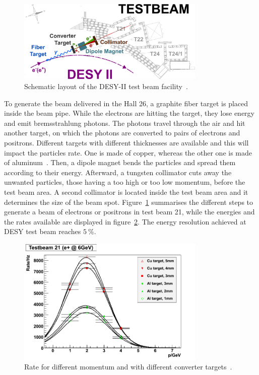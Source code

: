     \begin{figure}[!h]
      \centering
      \includegraphics[width = 0.8\textwidth]{Pictures/X0/desy_tb-sketch.png}
      \caption{Schematic layout of the DESY-II test beam facility~\cite{DESYII}.}
      \label{fig:desyTb-sketch}
    \end{figure}

    To generate the beam delivered in the Hall 26, a graphite fiber target is placed inside the beam pipe.
    While the electrons are hitting the target, they lose energy and emit bremsstrahlung photons.
    The photons travel through the air and hit another target, on which the photons are converted to pairs of electrons and positrons.
    Different targets with different thicknesses are available and this will impact the particles rate.
    One is made of copper, whereas the other one is made of aluminum~\cite{ConversionTargets}.
    Then, a dipole magnet bends the particles and spread them according to their energy.
    Afterward, a tungsten collimator cuts away the unwanted particles, those having a too high or too low momentum, before the test beam area.
    A second collimator is located inside the test beam area and it determines the size of the beam spot.
    Figure~\ref{fig:desyTb-sketch} summarises the different steps to generate a beam of electrons or positrons in test beam 21, while the energies and the rates available are displayed in figure~\ref{fig:rateTB21}.
    The energy resolution achieved at \gls{DESY} test beam reaches $5~\%$.

    \begin{figure}[!h]
      \centering
      \includegraphics[width = 0.8\textwidth]{Pictures/X0/rate_vs_p_t21.png}
      \caption{Rate for different momentum and with different converter targets~\cite{DESYII}.}
      \label{fig:rateTB21}
    \end{figure}

